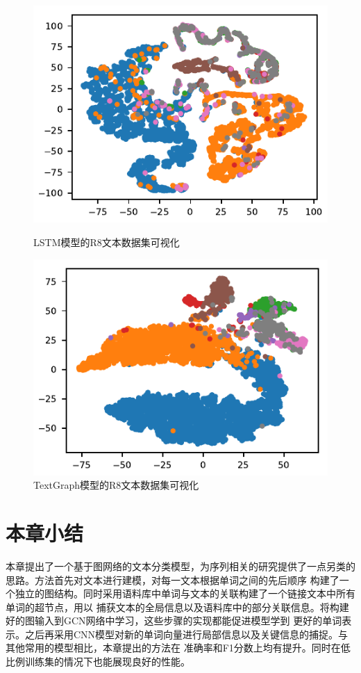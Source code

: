 \begin{figure}[htb]
    \begin{minipage}[t]{0.5\linewidth}
    \centering
    \includegraphics[width=1\textwidth]{pic/R8-RNN.pdf}
    \caption{LSTM模型的R8文本数据集可视化}
    \label{r8_embeding}
    \end{minipage}
    \quad
    \begin{minipage}[t]{0.5\linewidth}
    \centering
    \includegraphics[width=1\textwidth]{pic/R8-TextGraph.pdf}
    \caption{TextGraph模型的R8文本数据集可视化}
    \label{R8_TextGraph}
    \end{minipage}
\end{figure}

\section{本章小结}
本章提出了一个基于图网络的文本分类模型，为序列相关的研究提供了一点另类的思路。方法首先对文本进行建模，对每一文本根据单词之间的先后顺序
构建了一个独立的图结构。同时采用语料库中单词与文本的关联构建了一个链接文本中所有单词的超节点，用以
捕获文本的全局信息以及语料库中的部分关联信息。将构建好的图输入到GCN网络中学习，这些步骤的实现都能促进模型学到
更好的单词表示。之后再采用CNN模型对新的单词向量进行局部信息以及关键信息的捕捉。与其他常用的模型相比，本章提出的方法在
准确率和F1分数上均有提升。同时在低比例训练集的情况下也能展现良好的性能。
